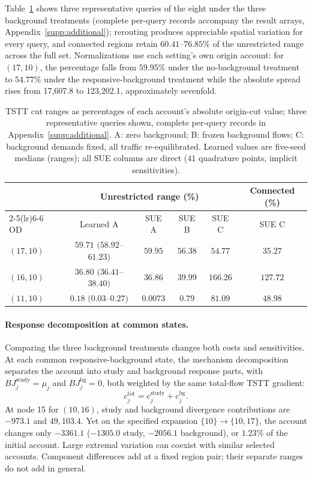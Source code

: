 Table~\ref{tab:cutspreadperod} shows three representative queries of the eight under the three background treatments (complete per-query records accompany the result arrays, Appendix~\ref{supp:additional}); rerouting produces appreciable spatial variation for every query, and connected regions retain $60.41$--$76.85\%$ of the unrestricted range across the full set. Normalizations use each setting's own origin account: for $(17,10)$, the percentage falls from $59.95\%$ under the no-background treatment to $54.77\%$ under the responsive-background treatment while the absolute spread rises from 17,607.8 to 123,202.1, approximately sevenfold.
\begin{table}[pos=htbp]
\footnotesize
\caption{TSTT cut ranges as percentages of each account's absolute
origin-cut value; three representative queries shown, complete per-query
records in Appendix~\ref{supp:additional}. A: zero background; B: frozen background
flows; C: background demands fixed, all traffic re-equilibrated. Learned
values are five-seed medians (ranges); all SUE columns are direct
($41$ quadrature points, implicit sensitivities).}\label{tab:cutspreadperod}
\small
\begin{tabular*}{\tblwidth}{@{\extracolsep{\fill}}lccccc}
\toprule
& \multicolumn{4}{c}{Unrestricted range (\%)} & Connected (\%)\\
\cmidrule(lr){2-5}\cmidrule(lr){6-6}
OD & Learned A & SUE A & SUE B & SUE C & SUE C\\
\midrule
$(17,10)$ & $59.71$ $(58.92$--$61.23)$ & $59.95$ & $56.38$ & $54.77$ & $35.27$ \\
$(16,10)$ & $36.80$ $(36.41$--$38.40)$ & $36.86$ & $39.99$ & $166.26$ & $127.72$ \\
$(11,10)$ & $0.18$ $(0.03$--$0.27)$ & $0.0073$ & $0.79$ & $81.09$ & $48.98$ \\
\bottomrule
\end{tabular*}
\end{table}
\paragraph{Response decomposition at common states.}\label{subsec:bgsplit}
Comparing the three background treatments changes both costs and sensitivities. At each common responsive-background state, the mechanism decomposition separates the account into study and background response parts, with $BJ_j^{\mathrm{study}}=\mu_j$ and $BJ_j^{\mathrm{bg}}=0$, both weighted by the same total-flow TSTT gradient:
\begin{equation}
c_j^{\mathrm{tot}}=c_j^{\mathrm{study}}+c_j^{\mathrm{bg}}.
\label{eq:bg_attribution}
\end{equation}
At node 15 for $(10,16)$, study and background divergence contributions are $-973.1$ and $49{,}103.4$. Yet on the specified expansion $\{10\}\to\{10,17\}$, the account changes only $-3361.1$ ($-1305.0$ study, $-2056.1$ background), or $1.23\%$ of the initial account. Large extremal variation can coexist with similar selected accounts. Component differences add at a fixed region pair; their separate ranges do not add in general.


